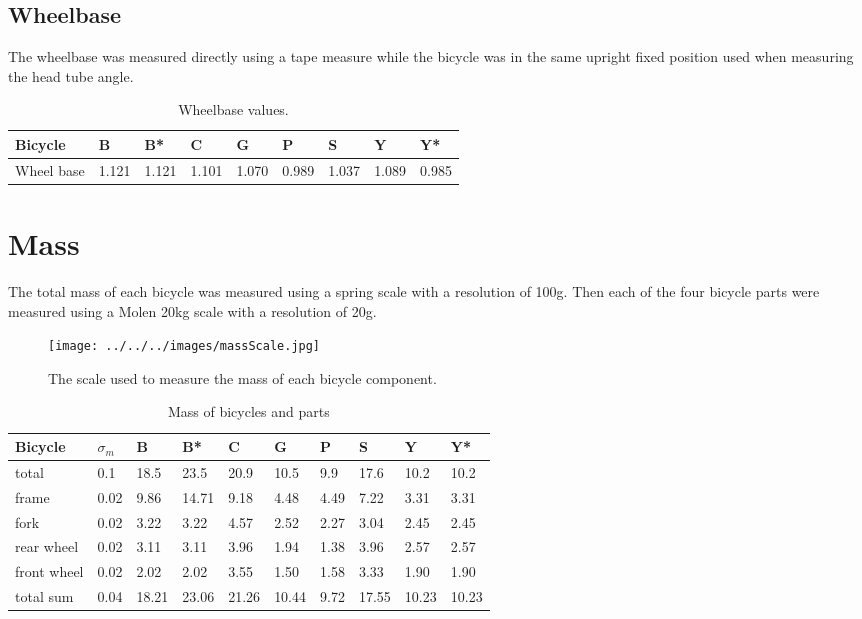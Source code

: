 \documentclass{bmd2010p}
\begin{document}
\subsection{Wheelbase}
The wheelbase was measured directly using a tape measure while the bicycle was
in the same upright fixed position used when measuring the head tube angle.
\begin{table}
	\begin{tabular}{lllllllll}
	Bicycle    & B     & B*    & C     & G     & P     & S     & Y     & Y*\\
    \hline
	Wheel base & 1.121 & 1.121 & 1.101 & 1.070 & 0.989 & 1.037 & 1.089 & 0.985
	\end{tabular}
	\caption{Wheelbase values.}
	\label{tab:wheelbase}
\end{table}

\section{Mass}
The total mass of each bicycle was measured using a spring scale with a
resolution of 100g. Then each of the four bicycle parts were measured using a
Molen 20kg scale with a resolution of 20g.
\begin{figure}[htbp]
    \begin{center}
        \texttt{[image: ../../../images/massScale.jpg]}
    \end{center}
    \caption{The scale used to measure the mass of each bicycle component.}
    \label{fig:massScale}
\end{figure}
\begin{table}
    \centering
	\begin{tabular}{llllllllll}
		Bicycle &     $\sigma_m$ & B     & B*    & C     & G     & P    & S     & Y     & Y*\\
        \hline
		total   &    0.1       & 18.5  & 23.5  & 20.9  & 10.5  & 9.9  & 17.6  & 10.2  & 10.2\\
        \hline
		frame   &    0.02      & 9.86  & 14.71 & 9.18  & 4.48  & 4.49 & 7.22  & 3.31  & 3.31\\
		fork    &    0.02      & 3.22  & 3.22  & 4.57  & 2.52  & 2.27 & 3.04  & 2.45  & 2.45\\
		rear wheel & 0.02      & 3.11  & 3.11  & 3.96  & 1.94  & 1.38 & 3.96  & 2.57  & 2.57\\
		front wheel& 0.02      & 2.02  & 2.02  & 3.55  & 1.50  & 1.58 & 3.33  & 1.90  & 1.90\\
		total sum  & 0.04      & 18.21 & 23.06 & 21.26 & 10.44 & 9.72 & 17.55 & 10.23 & 10.23
	\end{tabular}
	\caption{Mass of bicycles and parts}
	\label{tab:mass}
\end{table}
\end{document}
